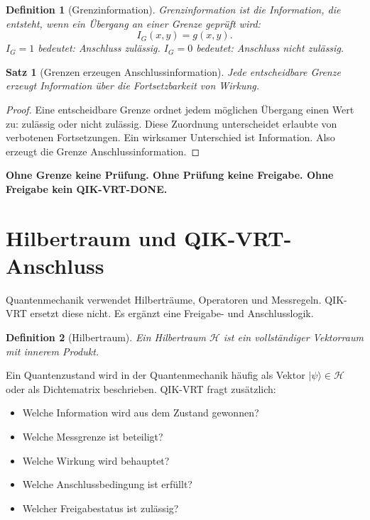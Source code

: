\documentclass[11pt,a4paper,oneside]{scrartcl}
\theoremstyle{qikstyle}
\newtheorem{definition}{Definition}[section]
\newtheorem{satz}{Satz}[section]
\newenvironment{merksatz}{\begin{center}\begin{minipage}{0.92\linewidth}\sffamily\bfseries}{\end{minipage}\end{center}}
\begin{document}
\begin{definition}[Grenzinformation]
Grenzinformation ist die Information, die entsteht, wenn ein Übergang an einer Grenze geprüft wird:
\[
I_G(x,y)=g(x,y).
\]
\(I_G=1\) bedeutet: Anschluss zulässig. \(I_G=0\) bedeutet: Anschluss nicht zulässig.
\end{definition}

\begin{satz}[Grenzen erzeugen Anschlussinformation]
Jede entscheidbare Grenze erzeugt Information über die Fortsetzbarkeit von Wirkung.
\end{satz}

\begin{proof}
Eine entscheidbare Grenze ordnet jedem möglichen Übergang einen Wert zu: zulässig oder nicht zulässig. Diese Zuordnung unterscheidet erlaubte von verbotenen Fortsetzungen. Ein wirksamer Unterschied ist Information. Also erzeugt die Grenze Anschlussinformation.
\end{proof}

\begin{merksatz}
Ohne Grenze keine Prüfung. Ohne Prüfung keine Freigabe. Ohne Freigabe kein QIK-VRT-DONE.
\end{merksatz}
\newpage

\section{Hilbertraum und QIK-VRT-Anschluss}

Quantenmechanik verwendet Hilberträume, Operatoren und Messregeln. QIK-VRT ersetzt diese nicht. Es ergänzt eine Freigabe- und Anschlusslogik.

\begin{definition}[Hilbertraum]
Ein Hilbertraum \(\mathcal{H}\) ist ein vollständiger Vektorraum mit innerem Produkt.
\end{definition}

Ein Quantenzustand wird in der Quantenmechanik häufig als Vektor \(|\psi\rangle\in\mathcal{H}\) oder als Dichtematrix beschrieben. QIK-VRT fragt zusätzlich:

\begin{itemize}
\item Welche Information wird aus dem Zustand gewonnen?
\item Welche Messgrenze ist beteiligt?
\item Welche Wirkung wird behauptet?
\item Welche Anschlussbedingung ist erfüllt?
\item Welcher Freigabestatus ist zulässig?
\end{itemize}
\end{document}
